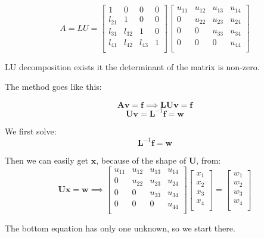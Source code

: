 \[
A = LU = 
    \begin{bmatrix}
    	1& 0& 0 & 0 \\
        l_{21} & 1 & 0 &0\\
        l_{31}&l_{32} & 1 & 0 \\
        l_{41} & l_{42} & l_{43} & 1\\
        \end{bmatrix}
    \begin{bmatrix}
    	u_{11}& u_{12}& u_{13} &u_{14} \\
        0 & u_{22} & u_{23} &u_{24}\\
        0& 0  &u_{33} & u_{34} \\
        0&0 & 0 & u_{44}\\
        \end{bmatrix}
\]

LU decomposition exists it the determinant of the matrix is non-zero.

The method goes like this:

\[
\textbf{A}\textbf{v} = \textbf{f} \implies \textbf{L}\textbf{U}\textbf{v} = \textbf{f}
\]
\[
\textbf{U}\textbf{v} = \textbf{L}^{-1}\textbf{f} = \textbf{w}
\]

We first solve:
\[
\textbf{L}^{-1}\textbf{f} = \textbf{w}
\]

Then we can easily get $\textbf{x}$, because of the shape of $\textbf{U}$, from:
\[
\textbf{Ux}=\textbf{w} \implies 
\begin{bmatrix}
		u_{11}& u_{12}& u_{13} &u_{14} \\
        0 & u_{22} & u_{23} &u_{24}\\
        0& 0  &u_{33} & u_{34} \\
        0&0 & 0 & u_{44}\\
        \end{bmatrix}
\begin{bmatrix}
x_1\\
x_2\\
x_3\\
x_4\\
\end{bmatrix} =
\begin{bmatrix}
w_1\\
w_2\\
w_3\\
w_4\\
\end{bmatrix}        
\]

The bottom equation has only one unknown, so we start there.